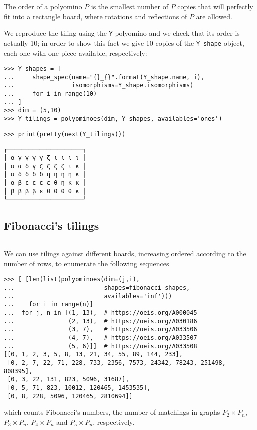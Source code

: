 \begin{definition}
The order of a polyomino $P$ is the smallest number of $P$ copies that will
perfectly fit into a rectangle board, where rotations and reflections of $P$
are allowed.
\end{definition}

We reproduce the tiling using the \verb|Y| polyomino and we check that its order is
actually 10; in order to show this fact we give 10 copies of the \verb|Y_shape| object,
each one with one piece available, respectively:
\begin{verbatim}
>>> Y_shapes = [
...     shape_spec(name="{}_{}".format(Y_shape.name, i),
...                isomorphisms=Y_shape.isomorphisms)
...     for i in range(10)
... ]
>>> dim = (5,10)
>>> Y_tilings = polyominoes(dim, Y_shapes, availables='ones')
\end{verbatim}

\begin{margintable}
\texttt{>>> print(pretty(next(Y_tilings)))}
{\footnotesize
\begin{verbatim}
┌─────────────────────┐
│ α γ γ γ γ ζ ι ι ι ι │
│ α α δ γ ζ ζ ζ ζ ι κ │
│ α δ δ δ δ η η η η κ │
│ α β ε ε ε ε θ η κ κ │
│ β β β β ε θ θ θ θ κ │
└─────────────────────┘
\end{verbatim}
}
\end{margintable}

\subsection{Fibonacci's tilings}

\inputminted[fontsize=\small,stripnl=false, firstline=514,lastline=530]{python}{backtracking/polyominoes.py}

We can use tilings against different boards, increasing ordered according to the
number of rows, to enumerate the following sequences
\begin{verbatim}
>>> [ [len(list(polyominoes(dim=(j,i),
...                         shapes=fibonacci_shapes,
...                         availables='inf')))
...    for i in range(n)]
...  for j, n in [(1, 13),  # https://oeis.org/A000045
...               (2, 13),  # https://oeis.org/A030186
...               (3, 7),   # https://oeis.org/A033506
...               (4, 7),   # https://oeis.org/A033507
...               (5, 6)]]  # https://oeis.org/A033508
[[0, 1, 2, 3, 5, 8, 13, 21, 34, 55, 89, 144, 233],
 [0, 2, 7, 22, 71, 228, 733, 2356, 7573, 24342, 78243, 251498, 808395],
 [0, 3, 22, 131, 823, 5096, 31687],
 [0, 5, 71, 823, 10012, 120465, 1453535],
 [0, 8, 228, 5096, 120465, 2810694]]
\end{verbatim}
which counts Fibonacci's numbers, the number of matchings in graphs $P_2 \times
P_n$, $P_{3} \times P_{n}$, $P_{4} \times P_{n}$ and $P_{5} \times P_{n}$,
respectively.

